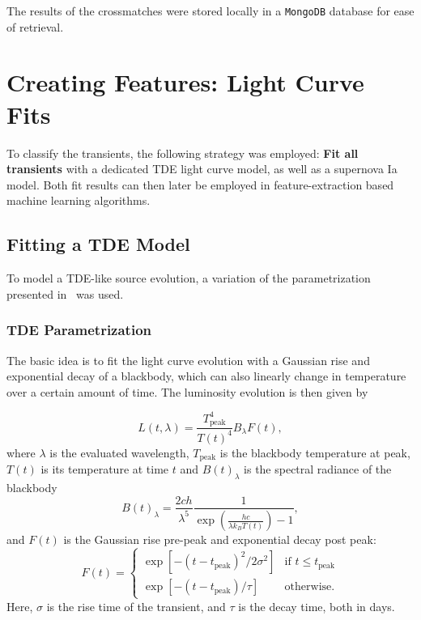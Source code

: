 The results of the crossmatches were stored locally in a \texttt{MongoDB} database for ease of retrieval.

\section{Creating Features: Light Curve Fits}
To classify the transients, the following strategy was employed: \textbf{Fit all transients} with a dedicated TDE light curve model, as well as a supernova Ia model. Both fit results can then later be employed in feature-extraction based machine learning algorithms.

\subsection{Fitting a TDE Model}\label{tde_model}
To model a TDE-like source evolution, a variation of the parametrization presented in~\cite{Velzen2021a} was used.

\subsubsection{TDE Parametrization}
The basic  idea is to fit the light curve evolution with a Gaussian rise and exponential decay of a blackbody, which can also linearly change in temperature over a certain amount of time. The luminosity evolution is then given by

\begin{equation}
    L(t,\lambda) = \frac{T_\text{peak}^4}{T(t)^4} B_\lambda F(t),
\end{equation}
where $\lambda$ is the evaluated wavelength, $T_\text{peak}$ is the blackbody temperature at peak, $T(t)$ is its temperature at time $t$ and $B(t)_\lambda$ is the spectral radiance of the blackbody
\begin{equation}
    B(t)_\lambda = \frac{2 c h}{\lambda^5} \frac{1}{\exp(\frac{hc}{\lambda k_B T(t)})-1},
\end{equation}
and $F(t)$ is the Gaussian rise pre-peak and exponential decay post peak:
\begin{equation}
    F(t) = \begin{cases}
        \exp[-(t-t_\text{peak})^2/2\sigma^2] & \text{if } t\leq t_\text{peak} \\
        \exp[-(t-t_\text{peak})/\tau]        & \text{otherwise.}
    \end{cases}
\end{equation}
Here, $\sigma$ is the rise time of the transient, and $\tau$ is the decay time, both in days.

